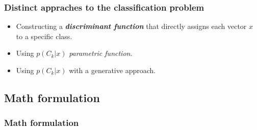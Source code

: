 \begin{frame}
    \frametitle{Distinct appraches to the classification problem}

    \begin{itemize}
        \item Constructing a \textbf{\textit{discriminant function}} that directly assigns each vector $x$ to a specific class. 
        \item Using $p(C_k | x)$ \textit{parametric function}.
        \item Using $p(C_k | x)$ with a generative approach. 
    \end{itemize}
\end{frame}

\subsection{Math formulation}
\begin{frame}
    \frametitle{Math formulation}

    

\end{frame}